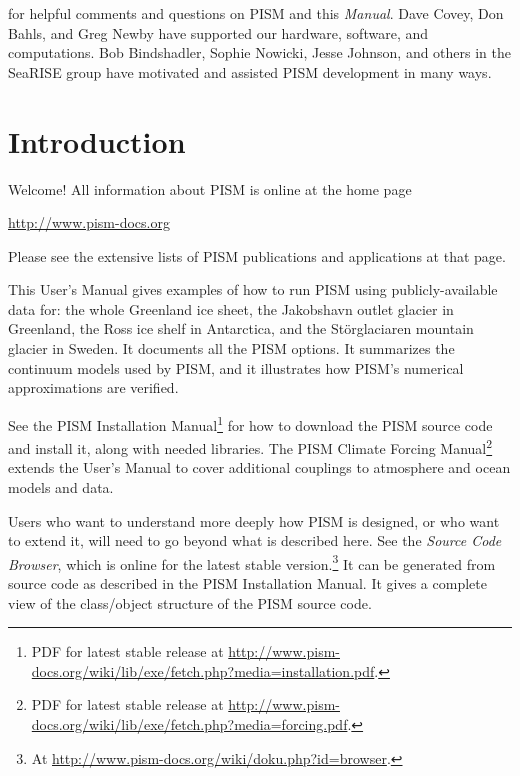 \documentclass[titlepage,letterpaper,final]{scrartcl}
\begin{document}
\noindent for helpful comments and questions on PISM and this \emph{Manual}.  Dave Covey, Don Bahls, and Greg Newby have supported our hardware, software, and computations.  Bob Bindshadler, Sophie Nowicki, Jesse Johnson, and others in the SeaRISE group have motivated and assisted PISM development in many ways.  

\normalsize



\newpage
\setcounter{tocdepth}{3}
\small
\tableofcontents
\normalsize

\newpage


\section{Introduction}\label{sec:intro}

Welcome!  All information about PISM is online at the home page
\begin{center}
  \url{http://www.pism-docs.org}
\end{center}
Please see the extensive lists of PISM publications and applications at that page.

This User's Manual gives examples of how to run PISM using publicly-available data for: the whole Greenland ice sheet, the Jakobshavn outlet glacier in Greenland, the Ross ice shelf in Antarctica, and the St\"orglaciaren mountain glacier in Sweden.  It documents all the PISM options.  It summarizes the continuum models used by PISM, and it illustrates how PISM's numerical approximations are verified.

See the PISM Installation Manual\footnote{PDF for latest stable release at \url{http://www.pism-docs.org/wiki/lib/exe/fetch.php?media=installation.pdf}.}
for how to download the PISM source code and install
it, along with needed libraries.  The PISM Climate Forcing
Manual\footnote{PDF for latest stable release at \url{http://www.pism-docs.org/wiki/lib/exe/fetch.php?media=forcing.pdf}.}
extends the User's Manual to cover additional couplings to atmosphere and ocean
models and data.

Users who want to understand more deeply how PISM is designed, or who want to extend it,  will need to go beyond what is described here.  See the \emph{Source Code Browser}, which is online for the latest stable version.\footnote{At \url{http://www.pism-docs.org/wiki/doku.php?id=browser}.}  It can be generated from source code as described in the PISM Installation Manual.  It gives a complete view of the class/object structure of the PISM source code.
\end{document}
